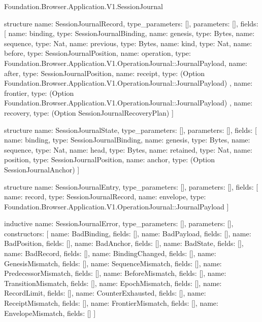 \begin{lexlean}{Foundation.Browser.Application.V1.SessionJournal}
\begin{semanticmodule}
structure{
  name: SessionJournalRecord,
  type_parameters: [],
  parameters: [],
  fields: [
    {name: binding, type: SessionJournalBinding},
    {name: genesis, type: Bytes},
    {name: sequence, type: Nat},
    {name: previous, type: Bytes},
    {name: kind, type: Nat},
    {name: before, type: SessionJournalPosition},
    {name: operation, type: Foundation.Browser.Application.V1.OperationJournal::JournalPayload},
    {name: after, type: SessionJournalPosition},
    {
      name: receipt,
      type: (Option Foundation.Browser.Application.V1.OperationJournal::JournalPayload)
    },
    {
      name: frontier,
      type: (Option Foundation.Browser.Application.V1.OperationJournal::JournalPayload)
    },
    {name: recovery, type: (Option SessionJournalRecoveryPlan)}
  ]
}

structure{
  name: SessionJournalState,
  type_parameters: [],
  parameters: [],
  fields: [
    {name: binding, type: SessionJournalBinding},
    {name: genesis, type: Bytes},
    {name: sequence, type: Nat},
    {name: head, type: Bytes},
    {name: retained, type: Nat},
    {name: position, type: SessionJournalPosition},
    {name: anchor, type: (Option SessionJournalAnchor)}
  ]
}

structure{
  name: SessionJournalEntry,
  type_parameters: [],
  parameters: [],
  fields: [
    {name: record, type: SessionJournalRecord},
    {name: envelope, type: Foundation.Browser.Application.V1.OperationJournal::JournalPayload}
  ]
}

inductive{
  name: SessionJournalError,
  type_parameters: [],
  parameters: [],
  constructors: [
    {name: BadBinding, fields: []},
    {name: BadPayload, fields: []},
    {name: BadPosition, fields: []},
    {name: BadAnchor, fields: []},
    {name: BadState, fields: []},
    {name: BadRecord, fields: []},
    {name: BindingChanged, fields: []},
    {name: GenesisMismatch, fields: []},
    {name: SequenceMismatch, fields: []},
    {name: PredecessorMismatch, fields: []},
    {name: BeforeMismatch, fields: []},
    {name: TransitionMismatch, fields: []},
    {name: EpochMismatch, fields: []},
    {name: RecordLimit, fields: []},
    {name: CounterExhausted, fields: []},
    {name: ReceiptMismatch, fields: []},
    {name: FrontierMismatch, fields: []},
    {name: EnvelopeMismatch, fields: []}
  ]
}


\end{semanticmodule}
\end{lexlean}
